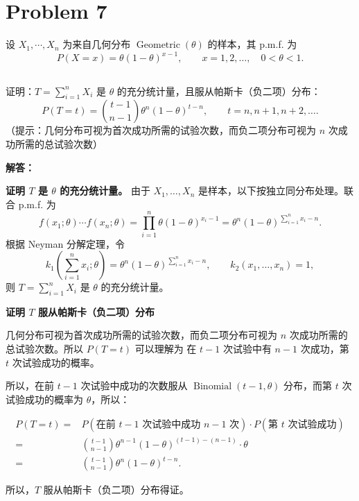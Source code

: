 \documentclass[12pt,a4paper]{article}
\begin{document}
\section{Problem 7}

设 $X_1,\cdots,X_n$ 为来自几何分布 $\operatorname{Geometric}(\theta)$ 的样本，其 p.m.f. 为
\[
P(X=x)=\theta(1-\theta)^{x-1},\qquad x=1,2,\ldots,\quad 0<\theta<1.
\]

\subsection{}

证明：$T=\sum_{i=1}^{n}X_i$ 是 $\theta$ 的充分统计量，且服从帕斯卡（负二项）分布：
  \[
  P(T=t)=\binom{t-1}{n-1}\theta^n(1-\theta)^{t-n},\qquad t=n,n+1,n+2,\ldots.
  \]
  （提示：几何分布可视为首次成功所需的试验次数，而负二项分布可视为 $n$ 次成功所需的总试验次数）

\begin{answerbox}
\textbf{解答：}

\textbf{证明 $T$ 是 $\theta$ 的充分统计量。}
由于 $X_1,\ldots,X_n$ 是样本，以下按独立同分布处理。联合 p.m.f. 为
\[
f(x_1;\theta)\cdots f(x_n;\theta)
=\prod_{i=1}^n\theta(1-\theta)^{x_i-1}
=\theta^n(1-\theta)^{\sum_{i=1}^nx_i-n}.
\]
根据 Neyman 分解定理，令
\[
k_1\left(\sum_{i=1}^nx_i;\theta\right)
=\theta^n(1-\theta)^{\sum_{i=1}^nx_i-n},
\qquad
k_2(x_1,\ldots,x_n)=1,
\]
则 $T=\sum_{i=1}^nX_i$ 是 $\theta$ 的充分统计量。

\textbf{证明 $T$ 服从帕斯卡（负二项）分布}

几何分布可视为首次成功所需的试验次数，而负二项分布可视为 $n$ 次成功所需的总试验次数。所以 $P(T=t)$ 可以理解为 在 $t-1$ 次试验中有 $n-1$ 次成功，第 $t$ 次试验成功的概率。

所以，在前 $t-1$ 次试验中成功的次数服从 $\operatorname{Binomial}(t-1, \theta)$ 分布，而第 $t$ 次试验成功的概率为 $\theta$，所以：

$$
\begin{aligned}
P(T = t) =& P(\text{在前 } t-1 \text{ 次试验中成功 } n-1 \text{ 次}) \cdot P(\text{第 } t \text{ 次试验成功}) \\
=& \binom{t-1}{n-1} \theta^{n-1} (1-\theta)^{(t-1)-(n-1)} \cdot \theta \\
=& \binom{t-1}{n-1} \theta^n (1-\theta)^{t-n}.
\end{aligned}
$$

所以，$T$ 服从帕斯卡（负二项）分布得证。

\end{answerbox}
  
\end{document}
